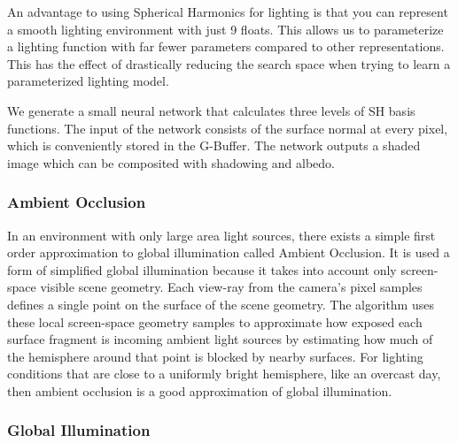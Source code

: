 \documentclass[10pt,twocolumn,letterpaper]{article}
\newcommand{\tompson}[1]{{\color{green} JT: #1}}
\begin{document}
An advantage to using Spherical Harmonics for lighting is that you can represent a smooth lighting environment with just 9 floats. This allows us to parameterize a lighting function with far fewer parameters compared to other representations. This has the effect of drastically reducing the search space when trying to learn a parameterized lighting model.

We generate a small neural network that calculates three levels of SH basis functions. The input of the network consists of the surface normal at every pixel, which is conveniently stored in the G-Buffer. The network outputs a shaded image which can be composited with shadowing and albedo.

\subsubsection{Ambient Occlusion}

In an environment with only large area light sources, there exists a simple first order approximation to global illumination called Ambient Occlusion. It is used a form of simplified global illumination because it takes into account only screen-space visible  scene geometry\cite{Miller:1994:EAL:192161.192244}.  Each view-ray from the camera's pixel samples defines a single point on the surface of the scene geometry. The algorithm uses these local screen-space geometry samples to approximate how exposed each surface fragment is incoming ambient light sources by estimating how much of the hemisphere around that point is blocked by nearby surfaces. For lighting conditions that are close to a uniformly bright hemisphere, like an overcast day, then ambient occlusion is a good approximation of global illumination.

\subsubsection{Global Illumination}\label{mitsuba_section}
\end{document}
